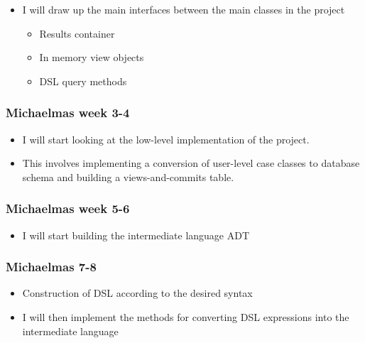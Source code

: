 \documentclass[12pt,a4paper,twoside,openright]{report}
\providecommand{\tightlist}{%
  \setlength{\itemsep}{0pt}\setlength{\parskip}{0pt}}
\begin{document}
\begin{itemize}
\tightlist
\item
  I will draw up the main interfaces between the main classes in the
  project

  \begin{itemize}
  \tightlist
  \item
    Results container
  \item
    In memory view objects
  \item
    DSL query methods
  \end{itemize}
\end{itemize}

\hypertarget{michaelmas-week-3-4}{%
\subsubsection{Michaelmas week 3-4}\label{michaelmas-week-3-4}}

\begin{itemize}
\tightlist
\item
  I will start looking at the low-level implementation of the project.
\item
  This involves implementing a conversion of user-level case classes to
  database schema and building a views-and-commits table.
\end{itemize}

\hypertarget{michaelmas-week-5-6}{%
\subsubsection{Michaelmas week 5-6}\label{michaelmas-week-5-6}}

\begin{itemize}
\tightlist
\item
  I will start building the intermediate language ADT
\end{itemize}

\hypertarget{michaelmas-7-8}{%
\subsubsection{Michaelmas 7-8}\label{michaelmas-7-8}}

\begin{itemize}
\tightlist
\item
  Construction of DSL according to the desired syntax
\item
  I will then implement the methods for converting DSL expressions into
  the intermediate language
\end{itemize}
\end{document}
